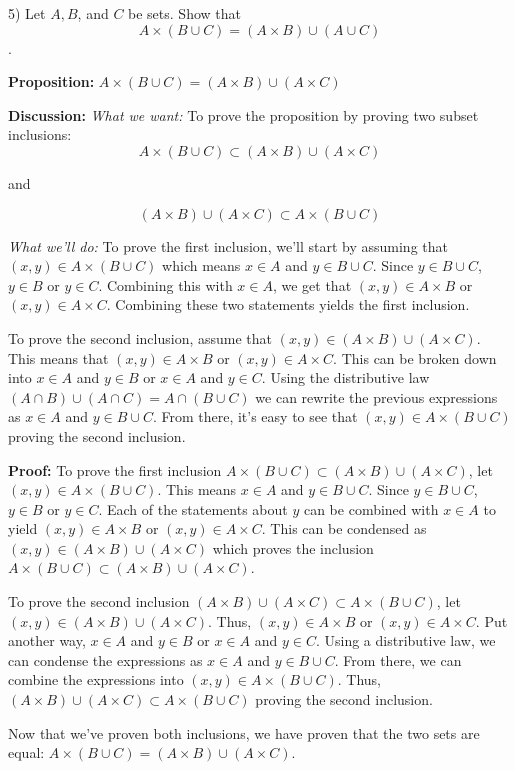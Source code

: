     \begin{paragraph}{5)}
        Let $A, B$, and $C$ be sets. Show that $$A \times (B \cup C) = (A \times B) \cup (A \cup C)$$.

        \separate\spacing

        \textbf{Proposition:} $A \times (B \cup C) = (A \times B) \cup (A \times C)$
        \spacing

        \textbf{Discussion:} 
        \textit{What we want:} To prove the proposition by proving two subset inclusions:
        $$A \times (B \cup C) \subset (A \times B) \cup (A \times C)$$
        \begin{center} and \end{center}
        $$(A \times B) \cup (A \times C) \subset A \times (B \cup C)$$

        \textit{What we'll do:} To prove the first inclusion, we'll start by assuming that 
        $(x, y) \in A \times (B \cup C)$ which means $x \in A$ and $y \in B \cup C$. Since
        $y \in B \cup C$, $y \in B$ or $y \in C$. Combining this with $x \in A$, we get that
        $(x, y) \in A \times B$ or $(x, y) \in A \times C$. Combining these two statements yields
        the first inclusion. 
        \spacing

        To prove the second inclusion, assume that $(x, y) \in (A \times B) \cup (A \times C).$
        This means that $(x, y) \in A \times B$ or $(x, y) \in A \times C$. This can be broken down into
        $x \in A$ and $y \in B$ or $x \in A$ and $y \in C$. Using the distributive law $(A \cap B) \cup (A \cap C) = A \cap (B \cup C)$ we can rewrite
        the previous expressions as $x \in A$ and $y \in B \cup C$. From there, it's easy to see that 
        $(x, y) \in A \times (B \cup C)$ proving the second inclusion. 
        \spacing

        \textbf{Proof:} To prove the first inclusion $A \times (B \cup C) \subset (A \times B) \cup (A \times C)$,
        let $(x, y) \in A \times (B \cup C)$. This means $x \in A$ and $y \in B \cup C$. Since $y \in B \cup C$,
        $y \in B$ or $y \in C$. Each of the statements about $y$ can be combined with $x \in A$  to yield
        $(x, y) \in A \times B$ or $(x, y) \in A \times C$. This can be condensed as $(x, y) \in (A \times B) \cup (A \times C)$
        which proves the inclusion $A\times (B \cup C) \subset (A \times B) \cup (A \times C)$.
        \spacing

        To prove the second inclusion $(A \times B) \cup (A \times C) \subset A \times (B \cup C)$, let
        $(x, y) \in (A \times B) \cup (A \times C)$. Thus, $(x, y) \in A \times B$ or $(x, y) \in A \times C$.
        Put another way, $x \in A$ and $y \in B$ or $x \in A$ and $y \in C$. Using a distributive law,
        we can condense the expressions as $x \in A$ and $y \in B \cup C$. From there, we can combine the expressions
        into $(x, y) \in A \times (B \cup C)$. Thus, $(A \times B) \cup (A \times C) \subset A \times (B \cup C)$ 
        proving the second inclusion.
        \spacing

        Now that we've proven both inclusions, we have proven that the two sets are equal:
        $A \times (B \cup C) = (A \times B) \cup (A \times C)$.

        \proofEnd
    \end{paragraph}
